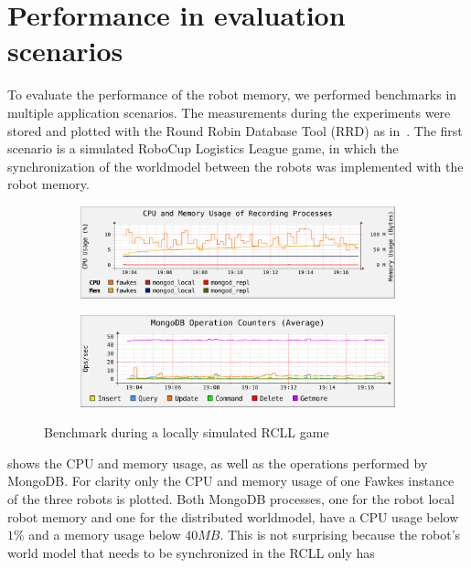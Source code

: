 \section{Performance in evaluation scenarios}
\label{sec:performance}
To evaluate the performance of the robot memory, we performed
benchmarks in multiple application scenarios. The measurements during
the experiments were stored and plotted
with the Round Robin Database Tool (RRD) as in~\cite{RoboDB}. The
first scenario is a simulated RoboCup Logistics League game, in which
the synchronization of the worldmodel between the robots was
implemented with the robot memory.
\begin{figure}
  \centering
  \begin{subfigure}[b]{1\textwidth}
    \includegraphics[width=\textwidth]{plots/rcll-local/cpu-mem}
    \label{fig:rcll-cpu-mem}
  \end{subfigure}
  \begin{subfigure}[b]{1\textwidth}
    \includegraphics[width=\textwidth]{plots/rcll-local/operations}
    \label{fig:rcll-ops}
  \end{subfigure}
  \caption[Benchmark during a locally simulated RCLL game]{Benchmark during a locally simulated RCLL game}
  \label{fig:rcll-benchmark}
\end{figure}
 shows the CPU and memory usage, as well as
the operations performed by MongoDB. For clarity only the CPU and
memory usage of one Fawkes instance of the three robots is
plotted. Both MongoDB processes, one for the robot local robot memory
and one for the distributed worldmodel, have a CPU usage below $1\%$
and a memory usage below $40MB$. This is not surprising because the
robot's world model that needs to be synchronized in the RCLL only has
